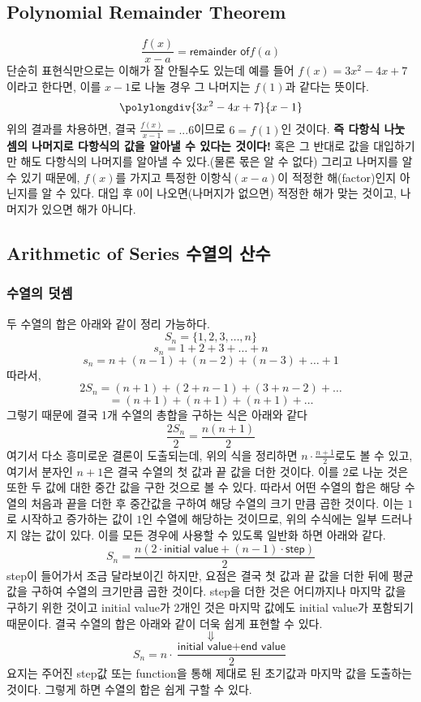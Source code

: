 \documentclass{article}
\begin{document}
\subsection{Polynomial Remainder Theorem}
$$\frac{f(x)}{x-a}={\textsf{remainder of}} f(a)$$
단순히 표현식만으로는 이해가 잘 안될수도 있는데 예를 들어 $f(x) = 3x^{2}-4x+7$이라고 한다면, 이를 $x-1$로 나눌 경우 그 나머지는 $f(1)$과 같다는 뜻이다.
$$\polylongdiv{3x^{2}-4x+7}{x-1}$$
위의 결과를 차용하면, 결국 $\frac{f(x)}{x-1}=...6$이므로 $6=f(1)$인 것이다. \textbf{즉 다항식 나눗셈의 나머지로 다항식의 값을 알아낼 수 있다는 것이다!} 혹은 그 반대로 값을 대입하기만 해도 다항식의 나머지를 알아낼 수 있다.(물론 몫은 알 수 없다) 그리고 나머지를 알 수 있기 때문에, $f(x)$를 가지고 특정한 이항식$(x-a)$이 적정한 해(factor)인지 아닌지를 알 수 있다. 대입 후 0이 나오면(나머지가 없으면) 적정한 해가 맞는 것이고, 나머지가 있으면 해가 아니다.

\subsection{Arithmetic of Series 수열의 산수}
\subsubsection{수열의 덧셈}
두 수열의 합은 아래와 같이 정리 가능하다.
$$S_n=\{1,2,3,\dots,n\}$$
$$s_n=1+2+3+\dots+n$$
$$s_n=n+(n-1)+(n-2)+(n-3)+\dots+1$$
따라서,
$$2S_n=(n+1)+(2+n-1)+(3+n-2)+\dots$$
$$=(n+1)+(n+1)+(n+1)+\dots$$
그렇기 때문에 결국 1개 수열의 총합을 구하는 식은 아래와 같다
$$\frac{2S_n}{2}=\frac{n(n+1)}{2}$$
여기서 다소 흥미로운 결론이 도출되는데, 위의 식을 정리하면 $n\cdot\frac{n+1}{2}$로도 볼 수 있고, 여기서 분자인 $n+1$은 결국 수열의 첫 값과 끝 값을 더한 것이다. 이를 $2$로 나눈 것은 또한 두 값에 대한 중간 값을 구한 것으로 볼 수 있다. 따라서 어떤 수열의 합은 해당 수열의 처음과 끝을 더한 후 중간값을 구하여 해당 수열의 크기 만큼 곱한 것이다. 이는 $1$로 시작하고 증가하는 값이 $1$인 수열에 해당하는 것이므로, 위의 수식에는 일부 드러나지 않는 값이 있다. 이를 모든 경우에 사용할 수 있도록 일반화 하면 아래와 같다.
$$S_n=\frac{n(2\cdot\textsf{initial value}+(n-1)\cdot\textsf{step})}{2}$$ step이 들어가서 조금 달라보이긴 하지만, 요점은 결국 첫 값과 끝 값을 더한 뒤에 평균 값을 구하여 수열의 크기만큼 곱한 것이다. step을 더한 것은 어디까지나 마지막 값을 구하기 위한 것이고 initial value가 2개인 것은 마지막 값에도 initial value가 포함되기 때문이다. 결국 수열의 합은 아래와 같이 더욱 쉽게 표현할 수 있다.
$$\Downarrow$$
$$S_n=n\cdot\frac{\textsf{initial value} + \textsf{end value}}{2}$$
요지는 주어진 step값 또는 function을 통해 제대로 된 초기값과 마지막 값을 도출하는 것이다. 그렇게 하면 수열의 합은 쉽게 구할 수 있다.
\end{document}
